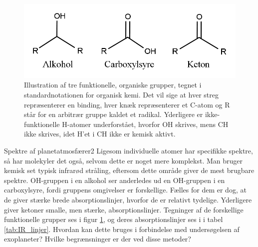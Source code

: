 %
%
\begin{figure}[h!]
    \centering
    \includegraphics[width=.8\textwidth]{Astrofysik/billeder/grupper.png}
    \caption{Illustration af tre funktionelle, organiske grupper, tegnet i standardnotationen for organisk kemi. Det vil sige at hver streg repræsenterer en binding, hver knæk repræsenterer et C-atom og R står for en arbitrær gruppe kaldet et radikal. Yderligere er ikke-funktionelle H-atomer underforstået, hvorfor OH skrives, mens CH ikke skrives, idet H'et i CH ikke er kemisk aktivt.}
    \label{fig:grupper}
\end{figure}   
%
%
\begin{opgave}{Spektre af planetatmosfærer}{2}
Ligesom individuelle atomer har specifikke spektre, så har molekyler det også, selvom dette er noget mere komplekst. Man bruger kemisk set typisk infrarød stråling, eftersom dette område giver de mest brugbare spektre. OH-gruppen i en alkohol ser anderledes ud en OH-gruppen i en carboxylsyre, fordi gruppens omgivelser er forskellige. Fælles for dem er dog, at de giver stærke brede absorptionslinjer, hvorfor de er relativt tydelige. Yderligere giver ketoner smalle, men stærke, absorptionslinjer. Tegninger af de forskellige funktionelle grupper ses i figur \ref{fig:grupper}, og deres absorptionslinjer ses i i tabel \ref{tab:IR_linjer}.
\opg Hvordan kan dette bruges i forbindelse med undersøgelsen af exoplaneter?
\opg Hvilke begrænsninger er der ved disse metoder? \\ \\ \\
\end{opgave}
%
%
